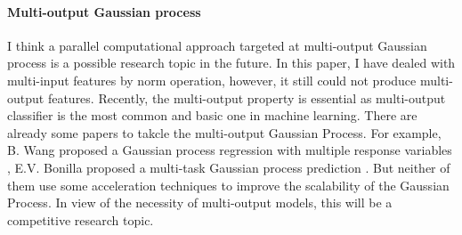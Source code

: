 \documentclass{article}
\begin{document}
\paragraph{Multi-output Gaussian process} I think a parallel computational approach targeted at multi-output Gaussian process is  a possible research topic in the future. In this paper, I have dealed with multi-input features by norm operation, however, it still could not produce multi-output features. Recently, the multi-output property is essential as multi-output classifier is the most common and basic one in machine learning. There are already some papers to takcle the multi-output Gaussian Process. For example, B. Wang proposed a Gaussian process regression with multiple response variables \cite{16}, E.V. Bonilla proposed a multi-task Gaussian process prediction \cite{17}. But neither of them use some acceleration techniques to improve the scalability of the Gaussian Process. In view of the necessity of multi-output models, this will be a competitive research topic.

\newpage
  
\end{document}
